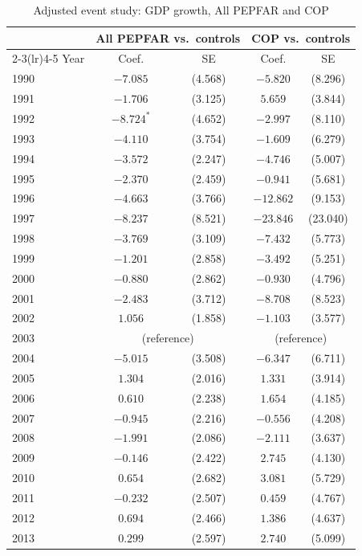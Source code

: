 \begin{table}[htbp]
\centering
\small
\caption{Adjusted event study: GDP growth, All PEPFAR and COP}
\label{tab:es_combined_gdp_growth}
\begin{tabular}{lcccc}
\toprule
 & \multicolumn{2}{c}{All PEPFAR vs.\ controls} & \multicolumn{2}{c}{COP vs.\ controls} \\
\cmidrule(lr){2-3}\cmidrule(lr){4-5}
Year & Coef. & SE & Coef. & SE \\
\midrule
1990 & $-7.085$ & (4.568) & $-5.820$ & (8.296) \\
1991 & $-1.706$ & (3.125) & $5.659$ & (3.844) \\
1992 & $-8.724^{*}$ & (4.652) & $-2.997$ & (8.110) \\
1993 & $-4.110$ & (3.754) & $-1.609$ & (6.279) \\
1994 & $-3.572$ & (2.247) & $-4.746$ & (5.007) \\
1995 & $-2.370$ & (2.459) & $-0.941$ & (5.681) \\
1996 & $-4.663$ & (3.766) & $-12.862$ & (9.153) \\
1997 & $-8.237$ & (8.521) & $-23.846$ & (23.040) \\
1998 & $-3.769$ & (3.109) & $-7.432$ & (5.773) \\
1999 & $-1.201$ & (2.858) & $-3.492$ & (5.251) \\
2000 & $-0.880$ & (2.862) & $-0.930$ & (4.796) \\
2001 & $-2.483$ & (3.712) & $-8.708$ & (8.523) \\
2002 & $1.056$ & (1.858) & $-1.103$ & (3.577) \\
2003 & \multicolumn{2}{c}{(reference)} & \multicolumn{2}{c}{(reference)} \\
2004 & $-5.015$ & (3.508) & $-6.347$ & (6.711) \\
2005 & $1.304$ & (2.016) & $1.331$ & (3.914) \\
2006 & $0.610$ & (2.238) & $1.654$ & (4.185) \\
2007 & $-0.945$ & (2.216) & $-0.556$ & (4.208) \\
2008 & $-1.991$ & (2.086) & $-2.111$ & (3.637) \\
2009 & $-0.146$ & (2.422) & $2.745$ & (4.130) \\
2010 & $0.654$ & (2.682) & $3.081$ & (5.729) \\
2011 & $-0.232$ & (2.507) & $0.459$ & (4.767) \\
2012 & $0.694$ & (2.466) & $1.386$ & (4.637) \\
2013 & $0.299$ & (2.597) & $2.740$ & (5.099) \\

\end{tabular}
\end{table}
